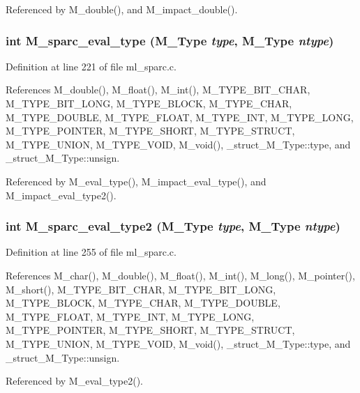 Referenced by M\_\-double(), and M\_\-impact\_\-double().
\subsubsection{\setlength{\rightskip}{0pt plus 5cm}int M\_\-sparc\_\-eval\_\-type (\bf{M\_\-Type} {\em type}, \bf{M\_\-Type} {\em ntype})}\label{ml__sparc_8c_3cca9430c46864e8d84d8cfe186ab46e}




Definition at line 221 of file ml\_\-sparc.c.

References M\_\-double(), M\_\-float(), M\_\-int(), M\_\-TYPE\_\-BIT\_\-CHAR, M\_\-TYPE\_\-BIT\_\-LONG, M\_\-TYPE\_\-BLOCK, M\_\-TYPE\_\-CHAR, M\_\-TYPE\_\-DOUBLE, M\_\-TYPE\_\-FLOAT, M\_\-TYPE\_\-INT, M\_\-TYPE\_\-LONG, M\_\-TYPE\_\-POINTER, M\_\-TYPE\_\-SHORT, M\_\-TYPE\_\-STRUCT, M\_\-TYPE\_\-UNION, M\_\-TYPE\_\-VOID, M\_\-void(), \_\-struct\_\-M\_\-Type::type, and \_\-struct\_\-M\_\-Type::unsign.

Referenced by M\_\-eval\_\-type(), M\_\-impact\_\-eval\_\-type(), and M\_\-impact\_\-eval\_\-type2().
\subsubsection{\setlength{\rightskip}{0pt plus 5cm}int M\_\-sparc\_\-eval\_\-type2 (\bf{M\_\-Type} {\em type}, \bf{M\_\-Type} {\em ntype})}\label{ml__sparc_8c_d06c06a99f51a2b11000f60e14ec6f10}




Definition at line 255 of file ml\_\-sparc.c.

References M\_\-char(), M\_\-double(), M\_\-float(), M\_\-int(), M\_\-long(), M\_\-pointer(), M\_\-short(), M\_\-TYPE\_\-BIT\_\-CHAR, M\_\-TYPE\_\-BIT\_\-LONG, M\_\-TYPE\_\-BLOCK, M\_\-TYPE\_\-CHAR, M\_\-TYPE\_\-DOUBLE, M\_\-TYPE\_\-FLOAT, M\_\-TYPE\_\-INT, M\_\-TYPE\_\-LONG, M\_\-TYPE\_\-POINTER, M\_\-TYPE\_\-SHORT, M\_\-TYPE\_\-STRUCT, M\_\-TYPE\_\-UNION, M\_\-TYPE\_\-VOID, M\_\-void(), \_\-struct\_\-M\_\-Type::type, and \_\-struct\_\-M\_\-Type::unsign.

Referenced by M\_\-eval\_\-type2().
